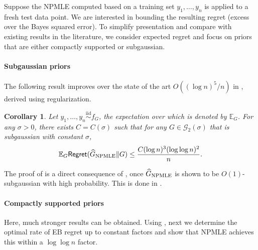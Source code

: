 \documentclass[letterpaper,11pt]{article}
\newcommand{\Expect}{\mathbb{E}}
\newcommand{\iid}{iid\xspace}
\newcommand{\iiddistr}{\stackrel{\text{\iid}}{\sim}}
\newcommand{\calG}{{\mathcal{G}}}
\newtheorem{corollary}[theorem]{Corollary}
\theoremstyle{definition}
\newcommand{\GNPMLE}{\hat G_{\rm NPMLE}}
\newcommand{\Regret}{\mathsf{Regret}}
\renewcommand{\hat}{\widehat}
\begin{document}
Suppose the NPMLE computed based on a training set $y_1,\ldots,y_n$ is applied to a fresh test data point. We are interested in bounding the resulting regret (excess over the Bayes squared error).
To simplify presentation and compare with existing results in the literature, we consider expected regret and focus on priors that are either compactly supported or subgaussian.



\paragraph{Subgaussian priors}



The following result improves over the state of the art $O((\log n)^5/n)$ in 
\cite{JiangZhang2009}, derived using regularization.




\begin{corollary}
\label{cor:NPMLE}
Let $y_1,\ldots,y_n \iiddistr f_G$, 
the expectation over which is denoted by $\Expect_G$.
For any $\sigma>0$, there exists $C=C(\sigma)$ such that for any $G \in \calG_2(\sigma)$ that is subgaussian with constant $\sigma$,
\begin{equation}
\Expect_G \Regret(\GNPMLE\|G) \leq \frac{
C (\log n)^3 (\log \log n)^2}{n}.
    \label{eq:reg-NPMLE}
\end{equation}
\end{corollary}
\noindent The proof of  is a direct consequence of 
, once $\GNPMLE$ is shown to be $O(1)$-subgaussian with high probability. This is done in .



\paragraph{Compactly supported priors}


Here, much stronger results can be obtained. Using , next
we determine the optimal rate of EB regret up to constant factors and show that NPMLE achieves this within a $\log \log n$ factor.
\end{document}

